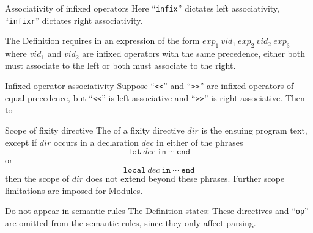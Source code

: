 \begin{comment}{Precedence must be between 0 and 9}
Observe this part of the Definition explicit constrains the precedence
for infixed operators must be between 0 and 9. In principle, there's no
reason it cannot be something larger (say, representable as an unsigned
byte or word --- i.e., between 0 and 256, or between 0 and
$2^{64}\approx 18.4\times 10^{18}$).
\end{comment}

\begin{clause}{Associativity of infixed operators}
Here ``\texttt{infix}'' dictates left associativity, ``\texttt{infixr}''
dictates right associativity.

The Definition requires in an expression of the form
$exp_{1}~vid_{1}~exp_{2}~vid_{2}~exp_{3}$ where $vid_{1}$ and $vid_{2}$
are infixed operators with the same precedence, either both must
associate to the left or both must associate to the right.
\end{clause}

\begin{example}{Infixed operator associativity}
Suppose ``\verb#<<#'' and ``\verb#>>#'' are infixed operators of equal
precedence, but ``\verb#<<#'' is left-associative and ``\verb#>>#'' is
right associative. Then
\halign to
\end{example}

\begin{definition}{Scope of fixity directive}\label{syntax-core:infixed-operator:scope}
The  of a fixity directive $dir$ is the ensuing program
text, except if $dir$ occurs in a declaration $dec$ in either of the
phrases
\begin{equation*}
\mathtt{let}~dec~\mathtt{in}~\cdots~\mathtt{end}
\end{equation*}
or
\begin{equation*}
\mathtt{local}~dec~\mathtt{in}~\cdots~\mathtt{end}
\end{equation*}
then the scope of $dir$ does not extend beyond these phrases. Further
scope limitations are imposed for Modules.
\end{definition}

\begin{clause}{Do not appear in semantic rules}
The Definition states: These directives and ``\texttt{op}'' are omitted
from the semantic rules, since they only affect parsing.
\end{clause}

